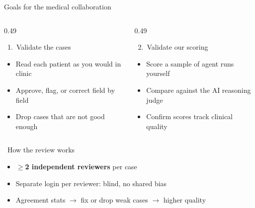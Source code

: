 \documentclass[aspectratio=169,t]{beamer}
\begin{document}
\begin{frame}{Goals for the medical collaboration}
  \centering\footnotesize\color{CERNtextdark}
  \begin{columns}[T,onlytextwidth]
    \begin{column}{0.49\textwidth}
      \begin{block}{{\color{CERNblue}\faStethoscope}\;\, 1.\ Validate the cases}
        \footnotesize
        \begin{itemize}\setlength\itemsep{0.2em}
          \item Read each patient as you would in clinic
          \item Approve, flag, or correct field by field
          \item Drop cases that are not good enough
        \end{itemize}
      \end{block}
    \end{column}%
    \hfill
    \begin{column}{0.49\textwidth}
      \begin{alertblock}{{\color{CERNorange}\faGavel}\;\, 2.\ Validate our scoring}
        \footnotesize
        \begin{itemize}\setlength\itemsep{0.2em}
          \item Score a sample of agent runs yourself
          \item Compare against the AI reasoning judge
          \item Confirm scores track clinical quality
        \end{itemize}
      \end{alertblock}
    \end{column}
  \end{columns}

  \vspace{1.5mm}
  \begin{exampleblock}{{\color{CERNcyan}\faUsers}\;\, How the review works}
    \footnotesize
    \begin{itemize}\setlength\itemsep{0.15em}
      \item $\geq$\textbf{2 independent reviewers} per case
      \item Separate login per reviewer: blind, no shared bias
      \item Agreement stats $\rightarrow$ fix or drop weak cases $\rightarrow$ higher quality
    \end{itemize}
  \end{exampleblock}
\end{frame}
\end{document}
